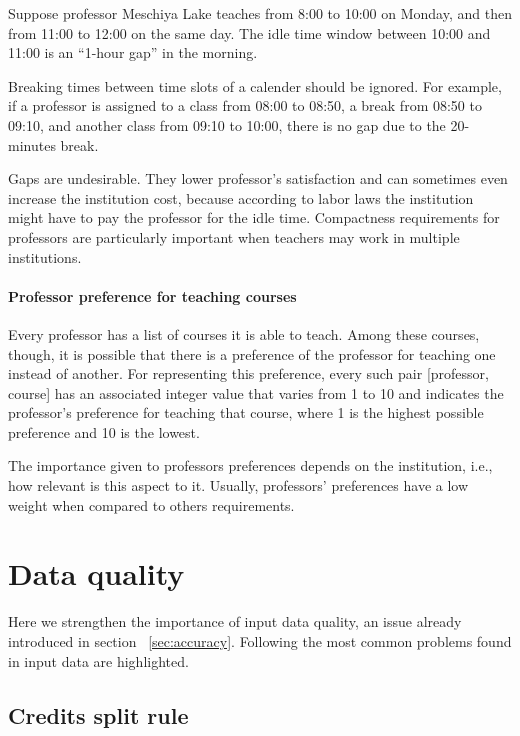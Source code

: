 Suppose professor Meschiya Lake teaches from 8:00 to 10:00 on Monday, and then from 11:00 to 12:00 on the same day. The idle time window between 10:00 and 11:00 is an ``1-hour gap'' in the morning.

Breaking times between time slots of a calender should be ignored. For example, if a professor is assigned to a class from 08:00 to 08:50, a break from 08:50 to 09:10, and another class from 09:10 to 10:00, there is no gap due to the 20-minutes break.

Gaps are undesirable. They lower professor's satisfaction and can sometimes even increase the institution cost, because according to labor laws the institution might have to pay the professor for the idle time. Compactness requirements for professors are particularly important when teachers may work in multiple institutions.



\paragraph{Professor preference for teaching courses}
\label{constrprefercourse}

Every professor has a list of courses it is able to teach. Among these courses, though, it is possible that there is a preference of the professor for teaching one instead of another. For representing this preference, every such pair [professor, course] has an associated integer value that varies from 1 to 10 and indicates the professor's preference for teaching that course, where 1 is the highest possible preference and 10 is the lowest.

The importance given to professors preferences depends on the institution, i.e., how relevant is this aspect to it. Usually, professors' preferences have a low weight when compared to others requirements.



\section{Data quality}

Here we strengthen the importance of input data quality, an issue already introduced in section ~\ref{sec:accuracy}. Following the most common problems found in input data are highlighted.

\subsection{Credits split rule}

